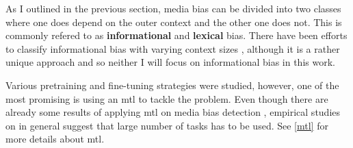 As I outlined in the previous section, media bias can be divided into two classes where one does depend on the outer context and the other one does not. This is commonly refered to as \textbf{informational} and \textbf{lexical} bias. There have been efforts to classify informational bias with varying context sizes \cite{van2020context}, although it is a rather unique approach and so neither I will focus on informational bias in this work.

Various pretraining and fine-tuning strategies were studied, however, one of the most promising is using an \Gls{mtl} to tackle the problem. Even though there are already some results of applying \Gls{mtl} on media bias detection \cite{lee2021unifying,spindeexploiting}, empirical studies on in general suggest that large number of tasks has to be used. See \ref{mtl} for more details about \gls{mtl}. 